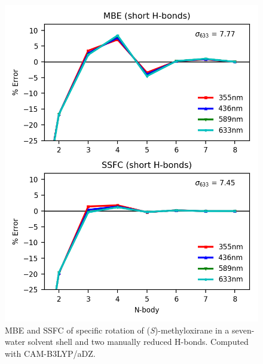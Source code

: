     \begin{figure}
        \centering
        \includegraphics[scale=0.75]{p1/graphs/si/metox_7_short_2_rot.png}
        \caption{MBE and SSFC of specific rotation of (\textit{S})-methyloxirane in a seven-water solvent shell and two manually reduced H-bonds. Computed with CAM-B3LYP/aDZ.}
        \label{metox7_short2_rot.png}
      \end{figure}
